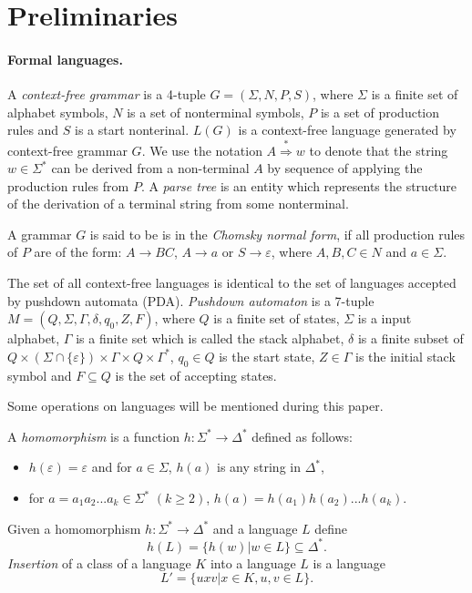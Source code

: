 \section{Preliminaries}
\label{sec:prel}
\label{preliminaries}
\paragraph{Formal languages.} 
A \textit{context-free grammar} is a 4-tuple $G = (\Sigma, N, P, S)$, where $\Sigma$ is a finite set of alphabet symbols,  $N$ is a set of nonterminal symbols, $P$ is a set of production rules and $S$ is a start nonterinal. $L(G)$ is a context-free language generated by context-free grammar $G$. We use the notation $A \stackrel {*}{\Rightarrow } w$  to denote that the string $w \in \Sigma^*$ can be derived from a non-terminal $A$ by sequence of applying the production rules from $P$. A \textit{parse tree} is an entity which represents the structure of the derivation of a terminal string from some nonterminal.


A grammar $G$ is said to be is in the \textit{Chomsky normal form}, if all production rules of $P$ are of the form:
$A \rightarrow BC$, $A \rightarrow a$ or $S \rightarrow \varepsilon$, where $A, B, C \in N$ and $a \in \Sigma$. 


The set of all context-free languages is identical to the set of languages accepted by pushdown automata (PDA). \textit{Pushdown automaton} is a 7-tuple $M = (Q, \Sigma, \Gamma, \delta, q_0, Z, F)$, where $Q$ is a finite set of states, $\Sigma$ is a input alphabet, $\Gamma$ is a finite set which is called the stack alphabet, $\delta$ is a finite subset of $Q \times (\Sigma \cap \{\varepsilon\}) \times \Gamma \times Q \times \Gamma^*$,
$q_{0}\in Q$ is the start state, $Z \in \Gamma$ is the initial stack symbol and
$F\subseteq Q$ is the set of accepting states.


Some operations on languages will be mentioned during this paper.


A \textit{homomorphism} is a function $h: \Sigma^* \rightarrow \Delta^*$ defined as follows: 
\begin{itemize}
\item $h(\varepsilon) = \varepsilon$ and for $a \in \Sigma$, $h(a)$ is any string in $\Delta^*$,
\item for $a = a_1a_2 ... a_k \in \Sigma^*$ $(k \ge 2)$, $h(a) = h(a_1)h(a_2)... h(a_k)$.
\end{itemize}
Given a homomorphism $h: \Sigma^* \rightarrow \Delta^*$ and a language $L$ define 
$$h(L)= \{h(w) | w \in L\} \subseteq \Delta^*.$$
\textit{Insertion} of a class of a language $K$ into a language $L$ is a language $$L' = \{uxv|x \in K, u, v \in L\}.$$ 


